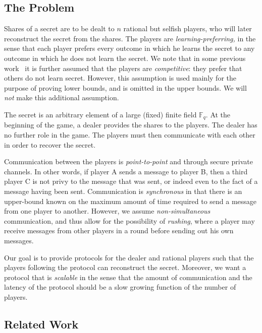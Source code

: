 \documentclass[12pt]{article}
\theoremstyle{definition}
\newcommand{\Fq}{\mathbb{F}_q}
\begin{document}
\subsection{The Problem}

Shares of a secret are to be dealt to $n$ rational but selfish
players, who will later reconstruct the secret from the shares. The
players are \emph{learning-preferring,} in the sense that each player
prefers every outcome in which he learns the secret to any outcome in
which he does not learn the secret.  We note that in some previous
work~\cite{kol2008games,abraham2006distributed} it is further assumed
that the players are \emph{competitive}: they prefer that others do
not learn secret. However, this assumption is used mainly for the
purpose of proving lower bounds, and is omitted in the upper bounds.
We will \emph{not} make this additional assumption.

The secret is an arbitrary element of a large (fixed) finite field
$\Fq$.  At the beginning of the game, a dealer provides the shares to
the players.  The dealer has no further role in the game. The players
must then communicate with each other in order to recover the secret.

Communication between the players is \emph{point-to-point} and through
secure private channels. In other words, if player A sends a message
to player B, then a third player C is not privy to the message that
was sent, or indeed even to the fact of a message having been sent.
Communication is \emph{synchronous} in that there is an upper-bound
known on the maximum amount of time required to send a message from
one player to another.  However, we assume \emph{non-simultaneous}
communication, and thus allow for the possibility of \emph{rushing},
where a player may receive messages from other players in a round
before sending out his own messages.

Our goal is to provide protocols for the dealer and rational players
such that the players following the protocol can reconstruct the
secret.  Moreover, we want a protocol that is \emph{scalable} in the
sense that the amount of communication and the latency of the protocol
should be a slow growing function of the number of players.


\subsection{Related Work}
\end{document}
